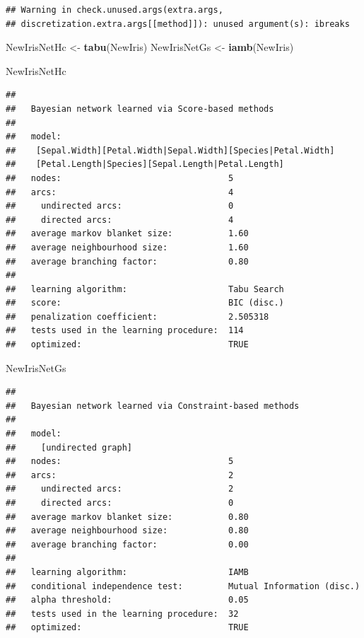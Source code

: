 \documentclass[]{article}
\newenvironment{Shaded}{\begin{snugshade}}{\end{snugshade}}
\newcommand{\KeywordTok}[1]{\textcolor[rgb]{0.13,0.29,0.53}{\textbf{{#1}}}}
\newcommand{\StringTok}[1]{\textcolor[rgb]{0.31,0.60,0.02}{{#1}}}
\newcommand{\NormalTok}[1]{{#1}}
\begin{document}
\begin{verbatim}
## Warning in check.unused.args(extra.args,
## discretization.extra.args[[method]]): unused argument(s): ibreaks
\end{verbatim}

\begin{Shaded}
\begin{Highlighting}[]
\NormalTok{NewIrisNetHc <-}\StringTok{ }\KeywordTok{tabu}\NormalTok{(NewIris)}
\NormalTok{NewIrisNetGs <-}\StringTok{ }\KeywordTok{iamb}\NormalTok{(NewIris)}

\NormalTok{NewIrisNetHc}
\end{Highlighting}
\end{Shaded}

\begin{verbatim}
## 
##   Bayesian network learned via Score-based methods
## 
##   model:
##    [Sepal.Width][Petal.Width|Sepal.Width][Species|Petal.Width]
##    [Petal.Length|Species][Sepal.Length|Petal.Length]
##   nodes:                                 5 
##   arcs:                                  4 
##     undirected arcs:                     0 
##     directed arcs:                       4 
##   average markov blanket size:           1.60 
##   average neighbourhood size:            1.60 
##   average branching factor:              0.80 
## 
##   learning algorithm:                    Tabu Search 
##   score:                                 BIC (disc.) 
##   penalization coefficient:              2.505318 
##   tests used in the learning procedure:  114 
##   optimized:                             TRUE
\end{verbatim}

\begin{Shaded}
\begin{Highlighting}[]
\NormalTok{NewIrisNetGs}
\end{Highlighting}
\end{Shaded}

\begin{verbatim}
## 
##   Bayesian network learned via Constraint-based methods
## 
##   model:
##     [undirected graph]
##   nodes:                                 5 
##   arcs:                                  2 
##     undirected arcs:                     2 
##     directed arcs:                       0 
##   average markov blanket size:           0.80 
##   average neighbourhood size:            0.80 
##   average branching factor:              0.00 
## 
##   learning algorithm:                    IAMB 
##   conditional independence test:         Mutual Information (disc.) 
##   alpha threshold:                       0.05 
##   tests used in the learning procedure:  32 
##   optimized:                             TRUE
\end{verbatim}
\end{document}
